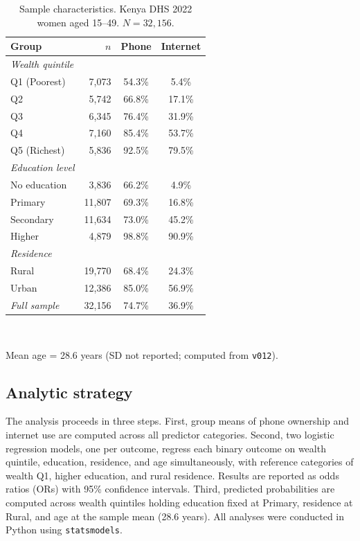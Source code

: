 \documentclass[9pt,twoside]{pnas-new}
\begin{document}
\begin{table}[h]
\centering
\caption{Sample characteristics. Kenya DHS 2022 women aged 15--49.
$N = 32{,}156$.}
\label{tab:sample}
\begin{tabular}{@{}lrcc@{}}
\toprule
Group & $n$ & Phone & Internet \\
\midrule
\textit{Wealth quintile} & & & \\
\quad Q1 (Poorest) & 7{,}073 & 54.3\% &  5.4\% \\
\quad Q2            & 5{,}742 & 66.8\% & 17.1\% \\
\quad Q3            & 6{,}345 & 76.4\% & 31.9\% \\
\quad Q4            & 7{,}160 & 85.4\% & 53.7\% \\
\quad Q5 (Richest)  & 5{,}836 & 92.5\% & 79.5\% \\
\addlinespace
\textit{Education level} & & & \\
\quad No education  &  3{,}836 & 66.2\% &  4.9\% \\
\quad Primary       & 11{,}807 & 69.3\% & 16.8\% \\
\quad Secondary     & 11{,}634 & 73.0\% & 45.2\% \\
\quad Higher        &  4{,}879 & 98.8\% & 90.9\% \\
\addlinespace
\textit{Residence} & & & \\
\quad Rural         & 19{,}770 & 68.4\% & 24.3\% \\
\quad Urban         & 12{,}386 & 85.0\% & 56.9\% \\
\addlinespace
\textit{Full sample} & 32{,}156 & 74.7\% & 36.9\% \\
\bottomrule
\end{tabular}
\smallskip\\
\raggedright{\footnotesize Mean age = 28.6 years (SD not reported;
computed from \texttt{v012}).}
\end{table}

\subsection*{Analytic strategy}

The analysis proceeds in three steps. First, group means of phone
ownership and internet use are computed across all predictor categories.
Second, two logistic regression models, one per outcome, regress each
binary outcome on wealth quintile, education, residence, and age
simultaneously, with reference categories of wealth Q1, higher
education, and rural residence. Results are reported as odds ratios (ORs)
with 95\% confidence intervals. Third, predicted probabilities are
computed across wealth quintiles holding education fixed at Primary,
residence at Rural, and age at the sample mean (28.6 years). All
analyses were conducted in Python using \texttt{statsmodels}.
\end{document}
